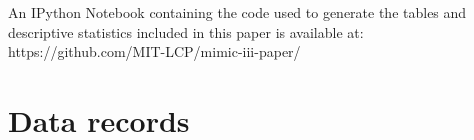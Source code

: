 \documentclass[english]{article}
\begin{document}
An IPython Notebook containing the code used to generate the tables and descriptive statistics included in this paper is available at: \\ https://github.com/MIT-LCP/mimic-iii-paper/


\section*{Data records}



\end{document}
